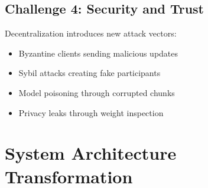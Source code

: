 \documentclass[11pt,conference]{article}
\begin{document}
\subsection{Challenge 4: Security and Trust}

Decentralization introduces new attack vectors:
\begin{itemize}
    \item Byzantine clients sending malicious updates
    \item Sybil attacks creating fake participants
    \item Model poisoning through corrupted chunks
    \item Privacy leaks through weight inspection
\end{itemize}

\section{System Architecture Transformation}
\end{document}
